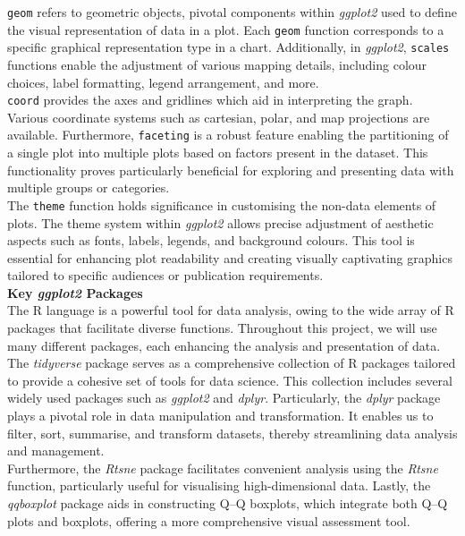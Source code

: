 \documentclass{article}\usepackage[]{graphicx}\usepackage[]{xcolor}
\numberwithin{equation}{section}
\begin{document}
\noindent
\texttt{geom} refers to geometric objects, pivotal components within \textit{ggplot2} used to define the visual representation of data in a plot. Each \texttt{geom} function corresponds to a specific graphical representation type in a chart. Additionally, in \textit{ggplot2}, \texttt{scales} functions enable the adjustment of various mapping details, including colour choices, label formatting, legend arrangement, and more.\\

\noindent \texttt{coord} provides the axes and gridlines which aid in interpreting the graph. Various coordinate systems such as cartesian, polar, and map projections are available. Furthermore, \texttt{faceting} is a robust feature enabling the partitioning of a single plot into multiple plots based on factors present in the dataset. This functionality proves particularly beneficial for exploring and presenting data with multiple groups or categories.\\

\noindent The \texttt{theme} function holds significance in customising the non-data elements of plots. The theme system within \textit{ggplot2} allows precise adjustment of aesthetic aspects such as fonts, labels, legends, and background colours. This tool is essential for enhancing plot readability and creating visually captivating graphics tailored to specific audiences or publication requirements.\\

\noindent \textbf{Key \textit{ggplot2} Packages}\\
\noindent The R language is a powerful tool for data analysis, owing to the wide array of R packages that facilitate diverse functions. Throughout this project, we will use many different packages, each enhancing the analysis and presentation of data.\\

\noindent The \textit{tidyverse} package serves as a comprehensive collection of R packages tailored to provide a cohesive set of tools for data science. This collection includes several widely used packages such as \textit{ggplot2} and \textit{dplyr}. Particularly, the \textit{dplyr} package plays a pivotal role in data manipulation and transformation. It enables us to filter, sort, summarise, and transform datasets, thereby streamlining data analysis and management.\\

\noindent Furthermore, the \textit{Rtsne} package facilitates convenient analysis using the \textit{Rtsne} function, particularly useful for visualising high-dimensional data. Lastly, the \textit{qqboxplot} package aids in constructing Q–Q boxplots, which integrate both Q–Q plots and boxplots, offering a more comprehensive visual assessment tool.\\ 
\end{document}
